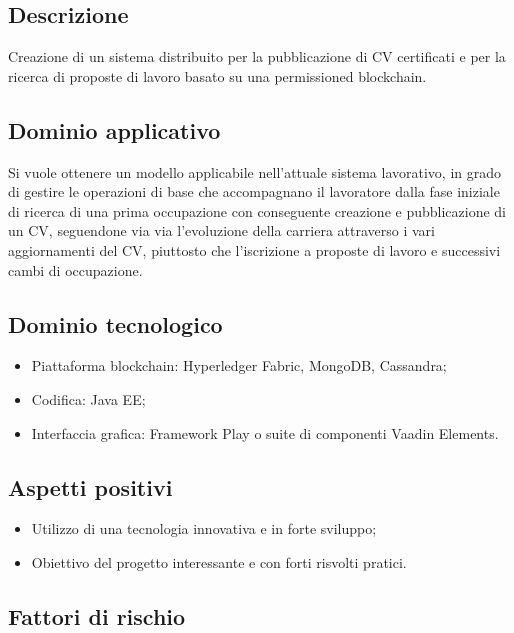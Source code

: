 \documentclass[openany,12pt,a4paper]{report}
\begin{document}
\subsection{Descrizione}

Creazione di un sistema distribuito per la pubblicazione di CV certificati e per la ricerca di proposte di lavoro basato su una permissioned blockchain.

\subsection{Dominio applicativo}

Si vuole ottenere un modello applicabile nell'attuale sistema lavorativo, in grado di gestire le operazioni di base che accompagnano il lavoratore dalla fase iniziale di ricerca di una prima occupazione con conseguente creazione e pubblicazione di un CV, seguendone via via l’evoluzione della carriera attraverso i vari aggiornamenti del CV, piuttosto che l’iscrizione a proposte di lavoro e successivi cambi di occupazione.

\subsection{Dominio tecnologico}

\begin{itemize}
    \item{Piattaforma blockchain:} Hyperledger Fabric, MongoDB, Cassandra;
    
    \item{Codifica:} Java EE;
    
    \item{Interfaccia grafica:} Framework Play o suite di componenti Vaadin Elements.
\end{itemize}

\subsection{Aspetti positivi}

\begin{itemize}
    \item Utilizzo di una tecnologia innovativa e in forte sviluppo;
    
    \item Obiettivo del progetto interessante e con forti risvolti pratici.
\end{itemize}

\subsection{Fattori di rischio}
\end{document}
